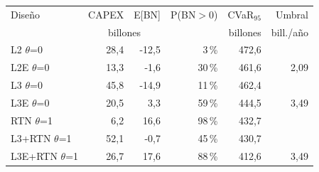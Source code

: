 \begin{tabular}{p{4.2cm}rrrrr}
\toprule
Diseño & CAPEX & E[BN] & P(BN$>$0) & CVaR$_{95}$ & Umbral \\
 & \multicolumn{2}{c}{billones} & & billones & bill./año \\
\midrule
L2 \textbar{} $\theta$=0 & 28,4 & -12,5 & 3\,\% & 472,6 &  \\
L2E \textbar{} $\theta$=0 & 13,3 & -1,6 & 30\,\% & 461,6 & 2,09 \\
L3 \textbar{} $\theta$=0 & 45,8 & -14,9 & 11\,\% & 462,4 &  \\
L3E \textbar{} $\theta$=0 & 20,5 & 3,3 & 59\,\% & 444,5 & 3,49 \\
RTN \textbar{} $\theta$=1 & 6,2 & 16,6 & 98\,\% & 432,7 &  \\
L3+\allowbreak{}RTN \textbar{} $\theta$=1 & 52,1 & -0,7 & 45\,\% & 430,7 &  \\
L3E+\allowbreak{}RTN \textbar{} $\theta$=1 & 26,7 & 17,6 & 88\,\% & 412,6 & 3,49 \\
\bottomrule
\end{tabular}
